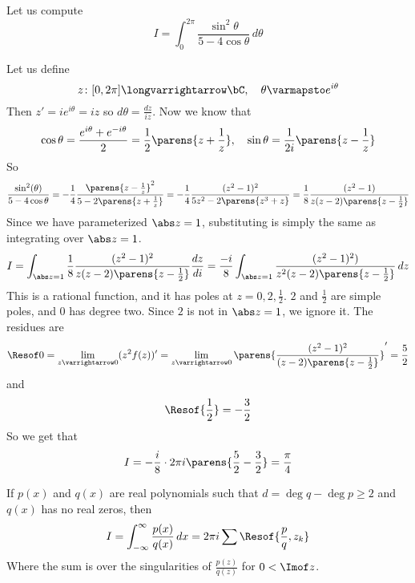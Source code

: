 \documentclass[10pt]{article}
\let\to=\varrightarrow
\let\longto=\longvarrightarrow
\begin{document}
\begin{exam*}

    Let us compute
    \[ I = \int_0^{2\pi}\frac{\sin^2\theta}{5-4\cos\theta}\,d\theta \]

    Let us define
    \[ z\colon[0,2\pi]\longto\bC,\quad \theta\varmapsto e^{i\theta} \]
    Then $z'=ie^{i\theta}=iz$ so $d\theta=\frac{dz}{iz}$.
    Now we know that
    \[ \cos\theta = \frac{e^{i\theta} + e^{-i\theta}}2 = \frac12\parens{z+\frac1z},\quad \sin\theta = \frac1{2i}\parens{z-\frac1z} \]
    So
    \[ \frac{\sin^2(\theta)}{5-4\cos\theta} = -\frac14\frac{\parens{z-\frac1z}^2}{5-2\parens{z+\frac1z}} = -\frac14\frac{(z^2-1)^2}{5z^2-2\parens{z^3+z}}
    = \frac18\frac{(z^2-1)}{z(z-2)\parens{z-\frac12}} \] 
    Since we have parameterized $\abs z=1$, substituting is simply the same as integrating over $\abs z=1$.
    \[ I = \int_{\abs z=1}\frac18\frac{(z^2-1)^2}{z(z-2)\parens{z-\frac12}}\frac{dz}{di} = \frac{-i}8\int_{\abs z=1}\frac{(z^2-1)^2)}{z^2(z-2)\parens{z-\frac12}}\,dz \]
    This is a rational function, and it has poles at $z=0,2,\frac12$.
    $2$ and $\frac12$ are simple poles, and $0$ has degree two.
    Since $2$ is not in $\abs z=1$, we ignore it.
    The residues are
    \[ \Resof0 = \lim_{z\to0}(z^2f(z))' = \lim_{z\to0}\parens{\frac{(z^2-1)^2}{(z-2)\parens{z-\frac12}}}' = \frac52 \]
    and
    \[ \Resof{\frac12} = -\frac32 \]
    So we get that
    \[ I = -\frac i8\cdot2\pi i\parens{\frac52-\frac32} = \frac\pi4 \]

\end{exam*}

\begin{prop*}

    If $p(x)$ and $q(x)$ are real polynomials such that $d=\deg q-\deg p\geq2$ and $q(x)$ has no real zeros, then
    \[ I = \int_{-\infty}^\infty\frac{p(x)}{q(x)}\,dx = 2\pi i\sum\Resof{\frac pq,z_k} \]
    Where the sum is over the singularities of $\frac{p(z)}{q(z)}$ for $0<\Imof z$.

\end{prop*}
\end{document}
